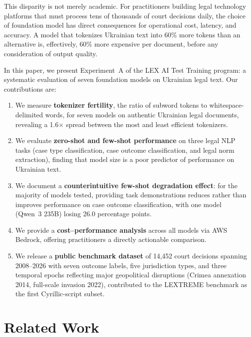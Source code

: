 \documentclass[11pt,a4paper]{article}
\begin{document}
This disparity is not merely academic. For practitioners building legal technology platforms that must process tens of thousands of court decisions daily, the choice of foundation model has direct consequences for operational cost, latency, and accuracy. A model that tokenizes Ukrainian text into 60\% more tokens than an alternative is, effectively, 60\% more expensive per document, before any consideration of output quality.

In this paper, we present Experiment~A of the LEX AI Test Training program: a systematic evaluation of seven foundation models on Ukrainian legal text. Our contributions are:

\begin{enumerate}[leftmargin=*]
    \item We measure \textbf{tokenizer fertility}, the ratio of subword tokens to whitespace-delimited words, for seven models on authentic Ukrainian legal documents, revealing a 1.6$\times$ spread between the most and least efficient tokenizers.
    \item We evaluate \textbf{zero-shot and few-shot performance} on three legal NLP tasks (case type classification, case outcome classification, and legal norm extraction), finding that model size is a poor predictor of performance on Ukrainian text.
    \item We document a \textbf{counterintuitive few-shot degradation effect}: for the majority of models tested, providing task demonstrations reduces rather than improves performance on case outcome classification, with one model (Qwen~3 235B) losing 26.0 percentage points.
    \item We provide a \textbf{cost--performance analysis} across all models via AWS Bedrock, offering practitioners a directly actionable comparison.
    \item We release a \textbf{public benchmark dataset} of 14,452 court decisions spanning 2008--2026 with seven outcome labels, five jurisdiction types, and three temporal epochs reflecting major geopolitical disruptions (Crimea annexation 2014, full-scale invasion 2022), contributed to the LEXTREME benchmark as the first Cyrillic-script subset.
\end{enumerate}

\section{Related Work}
\end{document}
